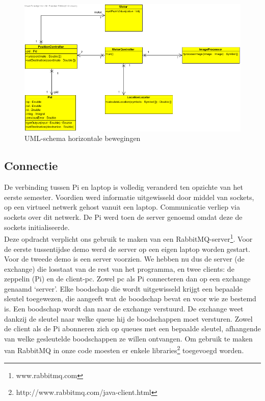 \documentclass[eind]{penoverslag}
\begin{document}
\begin{figure}[H]
\begin{center}
\includegraphics[width=\textwidth]{XYNavigation.png}
\end{center}
\caption{UML-schema horizontale bewegingen}
\label{navigation}
\end{figure}

\subsection{Connectie}
De verbinding tussen Pi en laptop is volledig veranderd ten opzichte van het eerste semester. Voordien werd informatie uitgewisseld door middel van sockets, op een virtueel netwerk gehost vanuit een laptop. Communicatie verliep via sockets over dit netwerk. De Pi werd toen de server genoemd omdat deze de sockets initialiseerde.\\
Deze opdracht verplicht ons gebruik te maken van een RabbitMQ-server\footnote{www.rabbitmq.com}. Voor de eerste tussentijdse demo werd de server op een eigen laptop worden gestart. Voor de tweede demo is een server voorzien. We hebben nu dus de server (de exchange) die losstaat van de rest van het programma, en twee clients: de zeppelin (Pi) en de client-pc. Zowel pc als Pi connecteren dan op een exchange genaamd ‘server’. Elke boodschap die wordt uitgewisseld krijgt een bepaalde sleutel toegewezen, die aangeeft wat de boodschap bevat en voor wie ze bestemd is. Een boodschap wordt dan naar de exchange verstuurd. De exchange weet dankzij de sleutel naar welke queue hij de boodschappen moet versturen. Zowel de client als de Pi abonneren zich op queues met een bepaalde sleutel, afhangende van welke gesleutelde boodschappen ze willen ontvangen. Om gebruik te maken van RabbitMQ in onze code moesten er enkele libraries\footnote{http://www.rabbitmq.com/java-client.html} toegevoegd worden. \\
\end{document}
